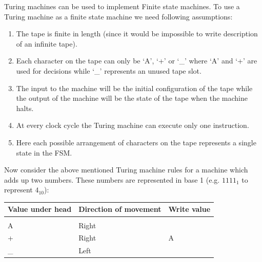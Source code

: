 \documentclass[a4paper,10pt]{article}
\theoremstyle{mytheor}
\begin{document}
{  Turing machines can be used to implement Finite state machines. To use
  a Turing machine as a finite state machine we need following
  assumptions:
  \begin{enumerate}
  \item The tape is finite in length (since it would be impossible
    to write description of an infinite tape).
  \item Each character on the tape can only be `A', `+' or `\_' where
    `A' and `+' are used for decisions while `\_' represents an unused
    tape slot.
  \item The input to the machine will be the initial configuration
    of the tape while the output of the machine will be the state of
    the tape when the machine halts.
  \item At every clock cycle the Turing machine can execute only one
    instruction.
  \item Here each possible arrangement of characters on the tape
    represents a single state in the FSM.
  \end{enumerate}

    Now consider the above mentioned Turing machine rules for a
    machine which adds up two numbers. These numbers are represented
    in base 1 (e.g. $1111_1$ to represent $4_{10}$):
    \begin{table}
      \centering
      \renewcommand{\arraystretch}{1.1}
      \begin{tabularx}{0.8\textwidth}{|X|X|X|}
        \hline
        \rowcolor{greatblue}
        \color{white} Value under head & \color{white}Direction of movement & \color{white}Write value \\
        \hline
        \vspace{0.2cm}&&\\
        A  & Right &   \\
        +  & Right & A \\
        \_ & Left &   \\
        \hline
      \end{tabularx}
    \end{table}

}
\end{document}
